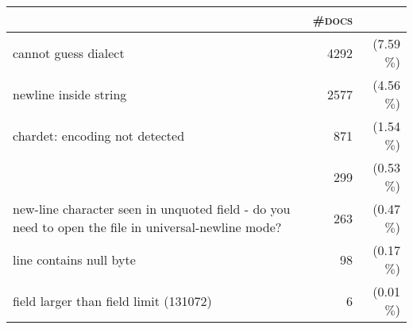 \begin{tabular}{p{7cm}rr} 
 \toprule 
 & \textsc{\#docs} & \\ 
 \midrule 
cannot guess dialect&4292 &(7.59$\%$)\\ 
  newline inside string&2577 &(4.56$\%$)\\ 
  chardet: encoding not detected&871 &(1.54$\%$)\\ 
  &299 &(0.53$\%$)\\ 
  new-line character seen in unquoted field - do you need to open the file in universal-newline mode?&263 &(0.47$\%$)\\ 
  line contains null byte&98 &(0.17$\%$)\\ 
  field larger than field limit (131072)&6 &(0.01$\%$)\\ 
  \bottomrule 
 \end{tabular}
